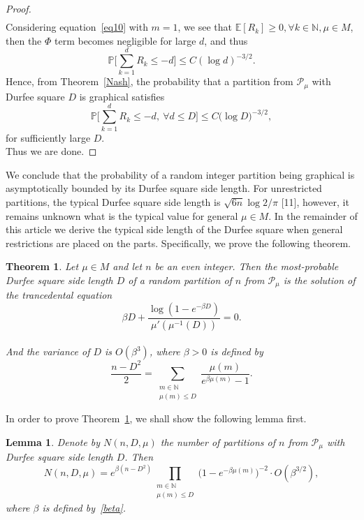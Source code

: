 \documentclass[pdflatex,sn-mathphys-num]{sn-jnl}%
\newtheorem{theorem}{Theorem}[section] %
\theoremstyle{thmstyleone}%
\theoremstyle{thmstyletwo}%
\theoremstyle{thmstylethree}%
\theoremstyle{thmstylethree}%
\newtheorem{lemma}{Lemma}%
\theoremstyle{thmstylethree}%
\begin{document}
\begin{proof}
\begin{equation*}
\begin{split}
    \end{split}
    \end{equation*}
    Considering equation~\eqref{eq10} with $m=1$, we see that $\mathbb{E}[R_k]\ge0, \forall k\in\mathbb{N},\mu\in M$, then the $\Phi$ term becomes negligible for large $d$, and thus
    \begin{equation*}
        \mathbb{P}\bigg[\sum_{k=1}^dR_k\le-d\bigg]\le C(\log d)^{-3/2}.
    \end{equation*}
    Hence, from Theorem~\ref{Nash}, the probability that a partition from $\mathcal{P}_\mu$ with Durfee square $D$ is graphical satisfies
    \begin{equation*}
        \mathbb{P}\bigg[\sum_{k=1}^dR_k\le-d, \ \forall d\le D\bigg]\le C\big(\log D\big)^{-3/2},
    \end{equation*}
    for sufficiently large $D$. \\
   Thus we are done.
\end{proof}
We conclude that the probability of a random integer partition being graphical is asymptotically bounded by its Durfee square side length. For unrestricted partitions, the typical Durfee square side length is $\sqrt{6n}\log2/\pi$ [11], however, it remains unknown what is the typical value for general $\mu\in M$. In the remainder of this article we derive the typical side length of the Durfee square when general restrictions are placed on the parts. Specifically, we prove the following theorem.
\begin{theorem}\label{theo2}
    Let $\mu\in M$ and let $n$ be an even integer. Then the most-probable Durfee square side length $D$ of a random partition of $n$ from $\mathcal{P}_\mu$ is the solution of the trancedental equation
    \begin{equation}\label{D-eq}
        \beta D+\frac{\log(1-e^{-\beta D})}{\mu'(\mu^{-1}(D))}=0.
    \end{equation} \\
    And the variance of $D$ is $O(\beta^3)$, where $\beta>0$ is defined by
    \begin{equation}\label{beta}
        \frac{n-D^2}{2}=\sum_{\substack{m\in\mathbb{N} \\ \mu(m)\le D}}\frac{\mu(m)}{e^{\beta\mu(m)}-1}.
    \end{equation}
\end{theorem}

\vspace{0.5cm}

In order to prove Theorem~\ref{theo2}, we shall show the following lemma first.
\begin{lemma}\label{D-lemma}
    Denote by $N(n,D,\mu)$ the number of partitions of $n$ from $\mathcal{P_{\mu}}$ with Durfee square side length $D$. Then
    \begin{equation}
        N(n,D,\mu)=e^{\beta(n-D^2)}\prod_{\substack{m\in\mathbb{N} \\ \mu(m)\le D}}\big(1-e^{-\beta\mu(m)}\big)^{-2} \cdot O(\beta^{3/2}),
    \end{equation}
    where $\beta$ is defined by~\eqref{beta}.
\end{lemma}
\end{document}
